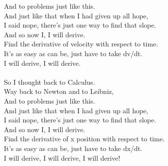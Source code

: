 And to problems just like this.\\
And just like that when I had given up all hope,\\
I said nope, there's just one way to find that slope.\\
And so now I, I will derive.\\
Find the derivative of velocity with respect to time.\\
It's as easy as can be, just have to take dv/dt.\\
I will derive, I will derive.\\
\\
So I thought back to Calculus.\\
Way back to Newton and to Leibniz,\\
And to problems just like this.\\
And just like that when I had given up all hope,\\
I said nope, there's just one way to find that slope.\\
And so now I, I will derive.\\
Find the derivative of x position with respect to time.\\
It's as easy as can be, just have to take dx/dt.\\
I will derive, I will derive, I will derive!